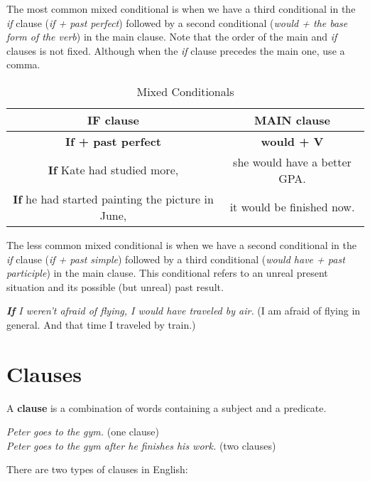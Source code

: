 \documentclass[hidelinks,10pt,a4paper]{article}
\begin{document}
\newpage
The most common mixed conditional is when we have a third conditional in the \textit{if} clause (\textit{if + past perfect}) followed by a second conditional (\textit{would + the base form of the verb}) in the main clause. Note that the order of the main and \textit{if} clauses is not fixed. Although when the \textit{if} clause precedes the main one, use a comma.

\begin{table}[h!]
\begin{center}
\begin{tabular}{|c|c|}
	\hline
	\textbf{IF clause} & \textbf{MAIN clause} \\ \hline
	\textbf{If + past perfect} & \textbf{would + V} \\ \hline
	\textbf{If} Kate had studied more, & she would have a better GPA. \\ \hline
	\textbf{If} he had started painting the picture in June, & it would be finished now. \\ \hline
\end{tabular}
\end{center}
\caption{Mixed Conditionals} \label{tab:mct}
\end{table}
The less common mixed conditional is when we have a second conditional in the \textit{if} clause (\textit{if + past simple}) followed by a third conditional (\textit{would have + past participle}) in the main clause. This conditional refers to an unreal present situation and its possible (but unreal) past result.

\begin{center}
	\textit{\textbf{If} I weren't afraid of flying, I would have traveled by air.} (I am afraid of flying in general. And that time I traveled by train.)
\end{center}

\section{Clauses}

A \textbf{clause} is a combination of words containing a subject and a predicate.

\begin{center}
	\textit{Peter goes to the gym.} (one clause)\\
	\textit{Peter goes to the gym after he finishes his work.} (two clauses)
\end{center}

There are two types of clauses in English:
\end{document}
